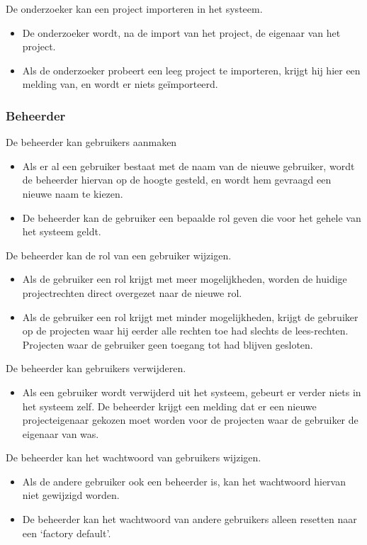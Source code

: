 \noindent
De onderzoeker kan een project importeren in het systeem.
\begin{itemize}
	\item De onderzoeker wordt, na de import van het project, de eigenaar van het project.
	\item Als de onderzoeker probeert een leeg project te importeren, krijgt hij hier een melding van, en wordt er niets ge\"importeerd.
\end{itemize}

\subsubsection{Beheerder}

De beheerder kan gebruikers aanmaken
\begin{itemize}
	\item Als er al een gebruiker bestaat met de naam van de nieuwe gebruiker, wordt de beheerder hiervan op de hoogte gesteld, en wordt hem gevraagd een nieuwe naam te kiezen.
	\item De beheerder kan de gebruiker een bepaalde rol geven die voor het gehele van het systeem geldt.
\end{itemize}

\noindent
De beheerder kan de rol van een gebruiker wijzigen.
\begin{itemize}
	\item Als de gebruiker een rol krijgt met meer mogelijkheden, worden de huidige projectrechten direct overgezet naar de nieuwe rol.
	\item Als de gebruiker een rol krijgt met minder mogelijkheden, krijgt de gebruiker op de projecten waar hij eerder alle rechten toe had slechts de lees-rechten. Projecten waar de gebruiker geen toegang tot had blijven gesloten.
\end{itemize}

\noindent
De beheerder kan gebruikers verwijderen.
\begin{itemize}
	\item Als een gebruiker wordt verwijderd uit het systeem, gebeurt er verder niets in het systeem zelf. De beheerder krijgt een melding dat er een nieuwe projecteigenaar gekozen moet worden voor de projecten waar de gebruiker de eigenaar van was.
\end{itemize}

\noindent
De beheerder kan het wachtwoord van gebruikers wijzigen.
\begin{itemize}
	\item Als de andere gebruiker ook een beheerder is, kan het wachtwoord hiervan niet gewijzigd worden.
	\item De beheerder kan het wachtwoord van andere gebruikers alleen resetten naar een `factory default'.
\end{itemize}